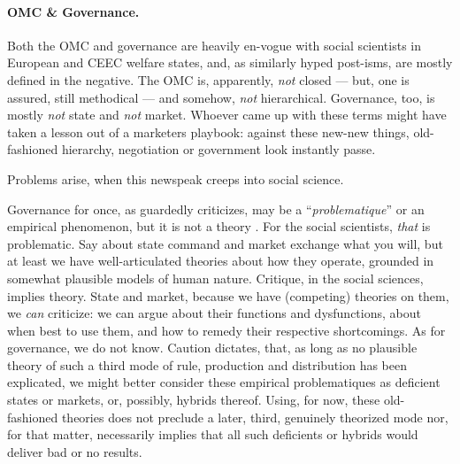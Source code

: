 \documentclass[11pt,a4paper,oneside,openright]{article}
\begin{document}
\paragraph{\gls{OMC} \& Governance.} Both the \gls{OMC} and governance are heavily en-vogue with social scientists in European and \gls{CEEC} welfare states, and, as similarly hyped post-isms, are mostly defined in the negative. 
The \gls{OMC} is, apparently, \emph{not} closed --- but, one is assured, still methodical --- and somehow, \emph{not} hierarchical. 
Governance, too, is mostly \emph{not} state and \emph{not} market. 
Whoever came up with these terms might have taken a lesson out of a marketers playbook: 
against these new-new things, old-fashioned hierarchy, negotiation or government look instantly passe. 

Problems arise, when this newspeak creeps into social science. 

Governance for once, as \citeauthor{Jachtenfuchs2001} guardedly criticizes, may be a ``\emph{problematique}'' or an empirical phenomenon, but it is not a theory \citeyearpar[259]{Jachtenfuchs2001}.
For the social scientists, \emph{that} is problematic. 
Say about state command and market exchange what you will, but at least we have well-articulated theories about how they operate, grounded in somewhat plausible models of human nature. 
Critique, in the social sciences, implies theory. 
State and market, because we have (competing) theories on them, we \emph{can} criticize: 
we can argue about their functions and dysfunctions, about when best to use them, and how to remedy their respective shortcomings. 
As for governance, we do not know. 
Caution dictates, that, as long as no plausible theory of such a third mode of rule, production and distribution has been explicated, we might better consider these empirical problematiques as deficient states or markets, or, possibly, hybrids thereof. 
Using, for now, these old-fashioned theories does not preclude a later, third, genuinely theorized mode nor, for that matter, necessarily implies that all such deficients or hybrids would deliver bad or no results.
\end{document}
